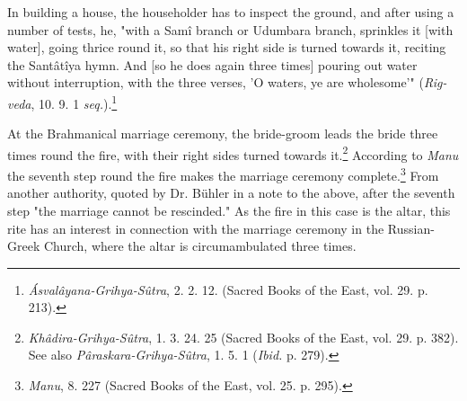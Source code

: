 \documentclass[a4paper, 11pt, oneside, polutonikogreek, english]{article}
\begin{document}
In building a house, the householder has to inspect the ground, and after using a number of tests, he, "with a Samî branch or Udumbara branch, sprinkles it [with water], going thrice round it, so that his right side is turned towards it, reciting the Santâtîya hymn. And [so he does again three times] pouring out water without interruption, with the three verses, 'O waters, ye are wholesome'" (\emph{Rig-veda}, 10. 9. 1 \emph{seq.}).\footnote{\emph{Ásvalâyana-Grihya-Sûtra}, 2. 2. 12. (Sacred Books of the East, vol. 29. p. 213).}

At the Brahmanical marriage ceremony, the bride-groom leads the bride three times round the fire, with their right sides turned towards it.\footnote{\emph{Khâdira-Grihya-Sûtra}, 1. 3. 24. 25 (Sacred Books of the East, vol. 29. p. 382). See also \emph{Pâraskara-Grihya-Sûtra}, 1. 5. 1 (\emph{Ibid.} p. 279).} According to \emph{Manu} the seventh step round the fire makes the marriage ceremony complete.\footnote{\emph{Manu}, 8. 227 (Sacred Books of the East, vol. 25. p. 295).} From another authority, quoted by Dr. Bühler in a note to the above, after the seventh step "the marriage cannot be rescinded." As the fire in this case is the altar, this rite has an interest in connection with the marriage ceremony in the Russian-Greek Church, where the altar is circumambulated three times.
\end{document}
